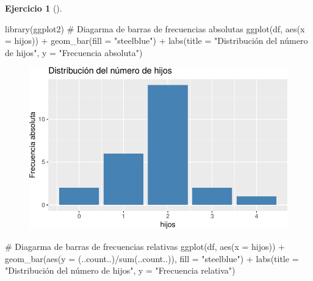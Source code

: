 \documentclass[
  a4paper,
]{scrreport}
\newenvironment{Shaded}{\begin{snugshade}}{\end{snugshade}}
\newcommand{\AttributeTok}[1]{\textcolor[rgb]{0.40,0.45,0.13}{#1}}
\newcommand{\CommentTok}[1]{\textcolor[rgb]{0.37,0.37,0.37}{#1}}
\newcommand{\FunctionTok}[1]{\textcolor[rgb]{0.28,0.35,0.67}{#1}}
\newcommand{\NormalTok}[1]{\textcolor[rgb]{0.00,0.23,0.31}{#1}}
\newcommand{\SpecialCharTok}[1]{\textcolor[rgb]{0.37,0.37,0.37}{#1}}
\newcommand{\StringTok}[1]{\textcolor[rgb]{0.13,0.47,0.30}{#1}}
\theoremstyle{definition}
\newtheorem{exercise}{Ejercicio}[chapter]
\theoremstyle{remark}
\begin{document}
\begin{exercise}[]
\begin{tcolorbox}
\begin{Shaded}
\begin{Highlighting}[]
\FunctionTok{library}\NormalTok{(ggplot2)}
\CommentTok{\# Diagarma de barras de frecuencias absolutas}
\FunctionTok{ggplot}\NormalTok{(df, }\FunctionTok{aes}\NormalTok{(}\AttributeTok{x =}\NormalTok{ hijos)) }\SpecialCharTok{+}
    \FunctionTok{geom\_bar}\NormalTok{(}\AttributeTok{fill =} \StringTok{"steelblue"}\NormalTok{) }\SpecialCharTok{+} 
    \FunctionTok{labs}\NormalTok{(}\AttributeTok{title =} \StringTok{"Distribución del número de hijos"}\NormalTok{, }\AttributeTok{y =} \StringTok{"Frecuencia absoluta"}\NormalTok{)}
\end{Highlighting}
\end{Shaded}

\begin{figure}[H]

{\centering \includegraphics{./03-frecuencias-graficos_files/figure-pdf/unnamed-chunk-7-1.pdf}

}

\end{figure}

\begin{Shaded}
\begin{Highlighting}[]
\CommentTok{\# Diagarma de barras de frecuencias relativas}
\FunctionTok{ggplot}\NormalTok{(df, }\FunctionTok{aes}\NormalTok{(}\AttributeTok{x =}\NormalTok{ hijos)) }\SpecialCharTok{+}
    \FunctionTok{geom\_bar}\NormalTok{(}\FunctionTok{aes}\NormalTok{(}\AttributeTok{y =}\NormalTok{ (..count..)}\SpecialCharTok{/}\FunctionTok{sum}\NormalTok{(..count..)), }\AttributeTok{fill =} \StringTok{"steelblue"}\NormalTok{) }\SpecialCharTok{+}
    \FunctionTok{labs}\NormalTok{(}\AttributeTok{title =} \StringTok{"Distribución del número de hijos"}\NormalTok{, }\AttributeTok{y =} \StringTok{"Frecuencia relativa"}\NormalTok{)}
\end{Highlighting}
\end{Shaded}


\end{tcolorbox}
\end{exercise}
\end{document}
